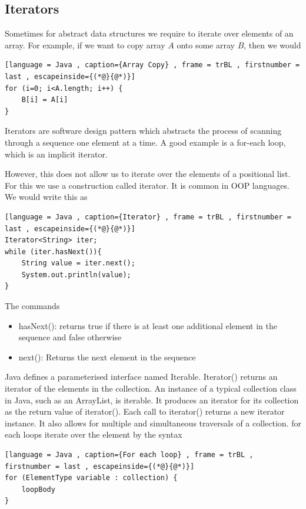 \documentclass[a4paper]{article}
\theoremstyle{plain}
\theoremstyle{definition}
\newtheorem{defn}{Definition}[section]
\theoremstyle{remark}
\begin{document}
\subsection{Iterators}
Sometimes for abstract data structures we require to iterate over elements of an array. For example, if we want to copy array $A$ onto some array $B$, then we would
\begin{lstlisting}[language = Java , caption={Array Copy} , frame = trBL , firstnumber = last , escapeinside={(*@}{@*)}]
for (i=0; i<A.length; i++) {
	B[i] = A[i]
}
\end{lstlisting}
\begin{tcolorbox}[colback=black!3!white,colframe=black!60!white,title=\begin{defn}Iterator \label{Iterator}\end{defn}]
Iterators are software design pattern which abstracts the process of scanning through a sequence one element at a time. A good example is a for-each loop, which is an implicit iterator.
\end{tcolorbox}
However, this does not allow us to iterate over the elements of a positional list. For this we use a construction called iterator. It is common in OOP languages. We would write this as
\begin{lstlisting}[language = Java , caption={Iterator} , frame = trBL , firstnumber = last , escapeinside={(*@}{@*)}]
Iterator<String> iter;
while (iter.hasNext()){
	String value = iter.next();
	System.out.println(value);
}
\end{lstlisting}
The commands
\begin{itemize}
	\item hasNext(): returns true if there is at least one additional element in the sequence and false otherwise
	\item next(): Returns the next element in the sequence
\end{itemize}
Java defines a parameterised interface named Iterable. Iterator() returns an iterator of the elements in the collection. An instance of a typical collection class in Java, such as an ArrayList, is iterable. It produces an iterator for its collection as the return value of iterator(). Each call to iterator() returns a new iterator instance. It also allows for multiple and simultaneous traversals of a collection. for each loops iterate over the element by the syntax
\begin{lstlisting}[language = Java , caption={For each loop} , frame = trBL , firstnumber = last , escapeinside={(*@}{@*)}]
for (ElementType variable : collection) {
	loopBody
}
\end{lstlisting}
\end{document}
